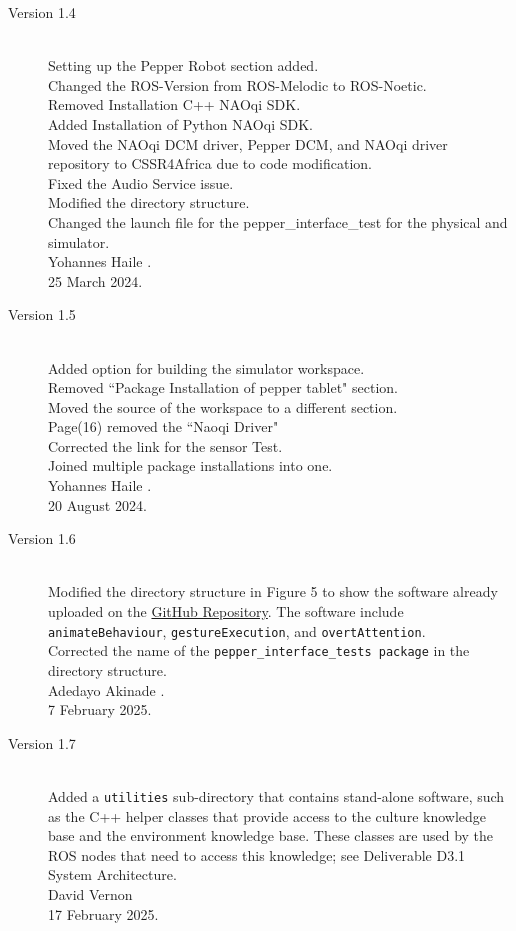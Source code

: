 \documentclass{CSSRforAfrica}
\begin{document}
{\begin{description}
\item [Version 1.4]~\\
Setting up the Pepper Robot section added.\\
Changed the ROS-Version from ROS-Melodic to ROS-Noetic.\\
Removed Installation C++ NAOqi SDK.\\
Added Installation of Python NAOqi SDK.\\
Moved the NAOqi DCM driver, Pepper DCM, and NAOqi driver repository to CSSR4Africa due to code modification.\\
Fixed the Audio Service issue.\\
Modified the directory structure.\\
Changed the launch file for the pepper\_interface\_test for the physical and simulator.\\
Yohannes Haile .\\
25 March 2024.

\newpage

\item [Version 1.5]~\\
Added option for building the simulator workspace.\\
Removed ``Package Installation of pepper tablet" section.\\
Moved the source of the workspace to a different section.\\
Page(16) removed the ``Naoqi Driver" \\
Corrected the link for the sensor Test. \\
Joined multiple package installations into one.\\
Yohannes Haile .\\
20 August 2024.

\item [Version 1.6]~\\
Modified the directory structure in Figure 5 to show the software already uploaded on the \href{https://github.com/cssr4africa/cssr4africa} {GitHub Repository}.
The software include \texttt{animateBehaviour}, \texttt{gestureExecution}, and \texttt{overtAttention}.\\
Corrected the name of the \texttt{pepper\_interface\_tests package} in the directory structure.\\
Adedayo Akinade .\\
7 February 2025.

\item [Version 1.7]~\\
Added a {\small \tt utilities} sub-directory that contains stand-alone software, such as the C++ helper classes that provide access to the culture knowledge base and the environment knowledge base. These classes are used by the ROS nodes that need to access this knowledge; see Deliverable D3.1 System Architecture.\\
David Vernon \\       
17 February 2025.


\end{description}}
\end{document}
